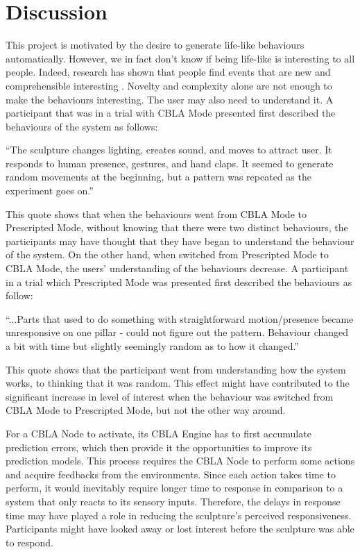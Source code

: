 \section{Discussion}


This project is motivated by the desire to generate life-like behaviours automatically. However, we in fact don't know if being life-like is interesting to all people. Indeed, research has shown that people find events that are new and comprehensible interesting \cite{Silvia2008}. Novelty and complexity alone are not enough to make the behaviours interesting. The user may also need to understand it. A participant that was in a trial with CBLA Mode presented first described the behaviours of the system as follows: 
\begin{blockquote}
	``The sculpture changes lighting, creates sound, and moves to attract user. It responds to human presence, gestures, and hand claps. It seemed to generate random movements at the beginning, but a pattern was repeated as the experiment goes on.''
\end{blockquote}
This quote shows that when the behaviours went from CBLA Mode to Prescripted Mode, without knowing that there were two distinct behaviours, the participants may have thought that they have began to understand the behaviour of the system. On the other hand, when switched from Prescripted Mode to CBLA Mode, the users' understanding of the behaviours decrease. A participant in a trial which Prescripted Mode was presented first described the behaviours as follow:
\begin{blockquote}
	``...Parts that used to do something with straightforward motion/presence became unresponsive on one pillar - could not figure out the pattern. Behaviour changed a bit with time but slightly seemingly random as to how it changed.''
\end{blockquote}
This quote shows that the participant went from understanding how the system works, to thinking that it was random. This effect might have contributed to the significant increase in level of interest when the behaviour was switched from CBLA Mode to Prescripted Mode, but not the other way around.

For a CBLA Node to activate, its CBLA Engine has to first accumulate prediction errors, which then provide it the opportunities to improve its prediction models. This process requires the CBLA Node to perform some actions and acquire feedbacks from the environments. Since each action takes time to perform, it would inevitably require longer time to response in comparison to a system that only reacts to its sensory inputs.
Therefore, the delays in response time may have played a role in reducing the sculpture's perceived responsiveness. Participants might have looked away or lost interest before the sculpture was able to respond. 

